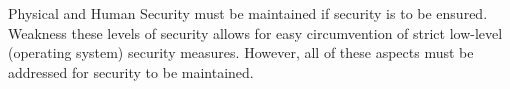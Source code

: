 Physical and Human Security must be maintained if  security is to be ensured.
Weakness these levels of security allows for easy circumvention of strict low-level (operating system) security measures.
However, all of these aspects must be addressed for security to be maintained.

